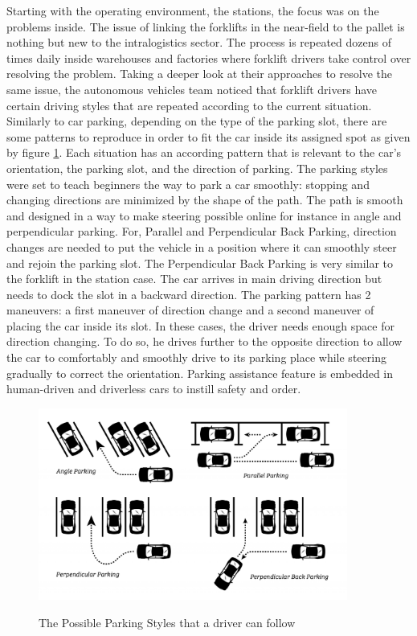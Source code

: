 Starting with the operating environment, the stations, the focus was on the problems inside. The issue of linking 
the forklifts in the near-field to the pallet is nothing but new to the intralogistics sector. 
The process is repeated dozens of times daily inside warehouses and factories where forklift drivers take control over 
resolving the problem. Taking a deeper look at their approaches to resolve the same issue, the autonomous vehicles team 
noticed that forklift drivers have certain driving styles that are repeated according to the current situation.
Similarly to car parking, depending on the type of the parking slot, there are some patterns to reproduce in order to fit 
the car inside its assigned spot as given by figure \ref{Parking_Styles}. 
Each situation has an according pattern that is relevant to the car's orientation, the parking slot, 
and the direction of parking. The parking styles were set to teach beginners the way to park a car 
smoothly: stopping and changing directions are minimized by the shape of the path.
The path is smooth and designed in a way to make steering possible online for instance in angle 
and perpendicular parking. For, Parallel and Perpendicular Back Parking, direction changes 
are needed to  put the vehicle in a position where it can smoothly steer and rejoin the parking slot.
The Perpendicular Back Parking is very similar to the forklift in the station case.
The car arrives in main driving direction but needs to dock the slot in a backward direction. 
The parking pattern has 2 maneuvers: a first maneuver of direction change and a second maneuver of 
placing the car inside its slot.
In these cases, the driver needs 
enough space for direction changing. To do so, he drives further to the opposite direction to allow 
the car to comfortably and smoothly drive to its parking place while steering gradually to correct the orientation.
Parking assistance feature is embedded in human-driven and driverless cars to instill safety and order.

\begin{figure}
    [H]
    \begin{center}
    \includegraphics[width=4in]{images/Chap2/perpendicular-parking-a-lot-scaled.jpg}\\
    \caption{The Possible Parking Styles that a driver can follow}
    \label{Parking_Styles}
    \end{center}
\end{figure}

